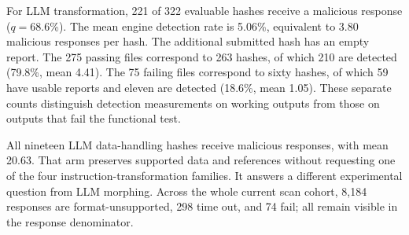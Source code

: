 For LLM transformation, 221 of 322 evaluable hashes receive a malicious
response ($q=68.6$\%). The mean engine detection rate is 5.06\%,
equivalent to 3.80 malicious responses per hash. The
additional submitted hash has an empty report. The 275 passing files
correspond to 263 hashes, of which 210 are detected (79.8\%, mean 4.41).
The 75 failing files correspond to sixty hashes, of which 59 have usable
reports and eleven are detected (18.6\%, mean 1.05). These separate counts distinguish detection measurements on working
outputs from those on outputs that fail the functional test.

All nineteen LLM data-handling hashes receive malicious responses, with
mean 20.63. That arm preserves supported data and references without
requesting one of the four instruction-transformation families. It answers
a different experimental question from LLM morphing. Across the whole
current scan cohort, 8,184 responses are format-unsupported, 298 time out,
and 74 fail; all remain visible in the response denominator.
